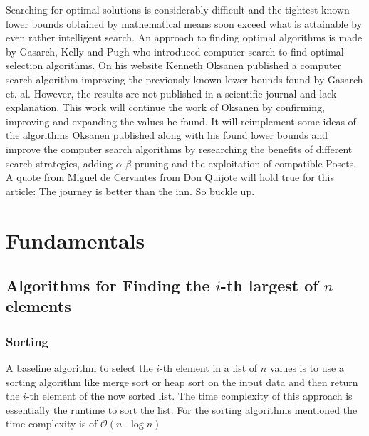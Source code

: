 \documentclass[10pt,journal,compsoc]{IEEEtran}
\begin{document}
Searching for optimal solutions is considerably difficult and the tightest known lower bounds
obtained by mathematical means soon exceed what is attainable by even rather intelligent search. An
approach to finding optimal algorithms is made by Gasarch, Kelly and Pugh \cite{Gasarch1996} who
introduced computer search to find optimal selection algorithms. On his website Kenneth Oksanen
\cite{Oksanen} published a computer search algorithm improving the previously known lower bounds
found by Gasarch et. al. However, the results are not published in a scientific journal and lack
explanation. This work will continue the work of Oksanen \cite{Oksanen} by confirming, improving and
expanding the values he found. It will reimplement some ideas of the algorithms Oksanen published
along with his found lower bounds and improve the computer search algorithms by researching the
benefits of different search strategies, adding $\alpha$-$\beta$-pruning and the exploitation of
compatible Posets. A quote from Miguel de Cervantes from Don Quijote will hold true for this
article: The journey is better than the inn. So buckle up.

\section{Fundamentals}
\subsection{Algorithms for Finding the $i$-th largest of $n$ elements}
\subsubsection{Sorting}
A baseline algorithm to select the $i$-th element in a list of $n$ values is to use a sorting
algorithm like merge sort or heap sort on the input data and then return the $i$-th element of the
now sorted list. The time complexity of this approach is essentially the runtime to sort the list.
For the sorting algorithms mentioned the time complexity is of $\mathcal{O}(n \cdot \log n)$
\end{document}
